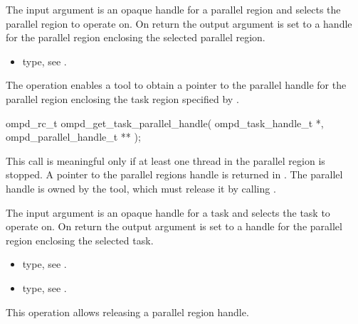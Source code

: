 \argdesc
The input argument  is an opaque handle for a parallel region and selects the parallel region to operate on.
On return the output argument  is set to a handle for the parallel region
enclosing the selected parallel region.

\crossreferences
\begin{itemize}
	\item {} type, see .
\end{itemize}

\label{ompd:ompd_get_task_parallel_handle}
\summary
The    operation enables a tool to obtain a 
pointer to the parallel handle for the parallel region enclosing the task region specified by 
.

\format

\cspecificstart
\begin{ompSyntax}
ompd_rc_t ompd_get_task_parallel_handle(
  ompd_task_handle_t *,
  ompd_parallel_handle_t **
);
\end{ompSyntax}
\cspecificend


\descr
This call is meaningful only if at least one thread in the parallel region is stopped.
A pointer to the parallel regions handle is returned in .
The parallel handle is owned by the 
tool, which must release it by calling .

\argdesc
The input argument  is an opaque handle for a task and selects the task to operate on.
On return the output argument  is set to a handle for the parallel region
enclosing the selected task.

\crossreferences
\begin{itemize}
	\item {} type, see .
	\item {} type, see .
\end{itemize}

\label{ompd:ompd_release_parallel_handle}
\summary
This operation allows releasing a parallel region handle.

